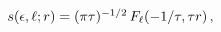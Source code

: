 $\mathop{s\/}\nolimits\!\left(\epsilon,\ell;r\right)=(\pi\tau)^{-1/2}\mathop{F_%
{\ell}\/}\nolimits\!\left(-1/\tau,\tau r\right),$